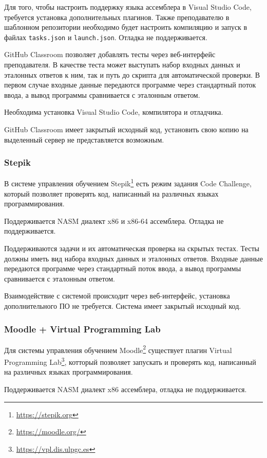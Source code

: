 \documentclass[a4paper,article,14pt]{extarticle}
\begin{document}
Для того, чтобы настроить поддержку языка ассемблера в Visual Studio Code, требуется установка дополнительных плагинов. Также преподавателю в шаблонном репозитории необходимо будет настроить компиляцию и запуск в файлах \texttt{tasks.json} и \texttt{launch.json}. Отладка не поддерживается.

GitHub Classroom позволяет добавлять тесты через веб-интерфейс преподавателя. В качестве теста может выступать набор входных данных и эталонных ответов к ним, так и путь до скрипта для автоматической проверки. В первом случае входные данные передаются программе через стандартный поток ввода, а вывод программы сравнивается с эталонным ответом.

Необходима установка Visual Studio Code, компилятора и отладчика.

GitHub Classroom имеет закрытый исходный код, установить свою копию на выделенный сервер не представляется возможным.

\subsubsection{Stepik}

В системе управления обучением Stepik\footnote{\url{https://stepik.org}} есть режим задания Code Challenge, который позволяет проверять код, написанный на различных языках программирования.

Поддерживается NASM диалект x86 и x86-64 ассемблера. Отладка не поддерживается.

Поддерживаются задачи и их автоматическая проверка на скрытых тестах. Тесты должны иметь вид набора входных данных и эталонных ответов. Входные данные передаются программе через стандартный поток ввода, а вывод программы сравнивается с эталонным ответом.

Взаимодействие с системой происходит через веб-интерфейс, установка дополнительного ПО не требуется. Система имеет закрытый исходный код.

\subsubsection{Moodle + Virtual Programming Lab}

Для системы управления обучением Moodle\footnote{\url{https://moodle.org/}} существует плагин Virtual Programming Lab\footnote{\url{https://vpl.dis.ulpgc.es}}, котторый позволяет запускать и проверять код, написанный на различных языках программирования.

Поддерживается NASM диалект x86 ассемблера, отладка не поддерживается.
\end{document}
